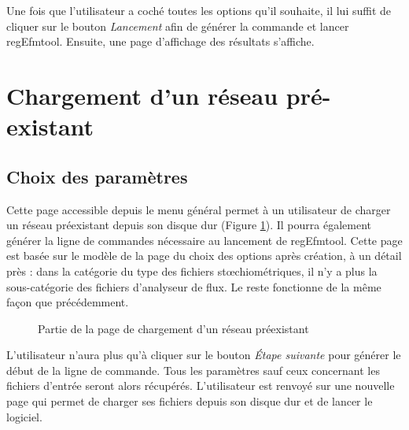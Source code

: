 Une fois que l'utilisateur a coché toutes les options qu'il souhaite, il lui suffit de cliquer sur le bouton \emph{Lancement} afin de générer la commande et lancer regEfmtool. Ensuite, une page d'affichage des résultats s'affiche. 

\section{Chargement d'un réseau pré-existant}

\subsection{Choix des paramètres}
Cette page accessible depuis le menu général permet à un utilisateur de charger un réseau préexistant depuis son disque dur (Figure \ref{chargement1}). Il pourra également générer la ligne de commandes nécessaire au lancement de regEfmtool. Cette page est basée sur le modèle de la page du choix des options après création, à un détail près : dans la catégorie du type des fichiers stœchiométriques, il n'y a plus la sous-catégorie des fichiers d'analyseur de flux. Le reste fonctionne de la m\^eme façon que précédemment. \\

\begin{figure}[!ht]
	\begin{center}
		\caption{Partie de la page de chargement d'un réseau préexistant}
  		\label{chargement1}
  	\end{center}	
\end{figure}

L'utilisateur n'aura plus qu'à cliquer sur le bouton \textit{Étape suivante} pour générer le début de la ligne de commande. Tous les paramètres sauf ceux concernant les fichiers d'entrée seront alors récupérés. L'utilisateur est renvoyé sur une nouvelle page qui permet de charger ses fichiers depuis son disque dur et de lancer le logiciel. 

